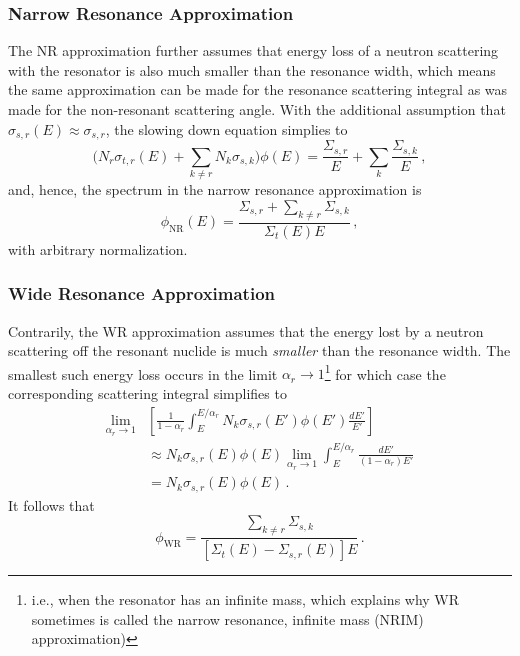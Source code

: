\subsubsection*{Narrow Resonance Approximation}

The NR approximation further assumes that energy loss of a neutron 
scattering with the resonator is also much smaller than the 
resonance width, which means the same approximation can be made 
for the resonance scattering integral as was made for the 
non-resonant scattering angle.  With the additional assumption 
that $\sigma_{s, r}(E) \approx \sigma_{s, r}$, the slowing 
down equation simplies to
\begin{equation}
     \Bigg ( N_r \sigma_{t,r}(E) + 
             \sum_{k\neq r} N_k \sigma_{s,k} 
     \Bigg ) \phi(E) = \frac{\Sigma_{s,r}}{E} + \sum_k \frac{\Sigma_{s,k}}{E} \, ,
\end{equation}
and, hence, the spectrum in the narrow resonance approximation is
\begin{equation}
 \phi_{\text{NR}}(E) = 
   \frac{ \Sigma_{s,r} + \sum\limits_{k\neq r} \Sigma_{s,k} }{ \Sigma_{t}(E) E } \, ,
\end{equation}
with arbitrary normalization.

\subsubsection*{Wide Resonance Approximation}

Contrarily, the WR approximation assumes that the energy lost by a
neutron scattering off the resonant nuclide is much \emph{smaller} than 
the resonance width.  The smallest such energy loss 
occurs in the limit $\alpha_r \to 1$\footnote{i.e., when the 
resonator has an infinite mass, which explains why WR sometimes 
is called the narrow resonance, infinite mass (NRIM) approximation)} 
for which case the corresponding 
scattering integral simplifies to 
\begin{equation}
\begin{split}
 \lim_{\alpha_r \to 1} & \left [ \frac{1}{1-\alpha_r} 
          \int^{E/\alpha_r}_E N_k \sigma_{s,r} (E') \phi(E') \frac{dE'}{E'} \right ] \\ 
  &\approx N_k \sigma_{s,r} (E) \phi(E) \lim_{\alpha_r \to 1}  \int^{E/\alpha_r}_E  \frac{dE'}{(1-\alpha_r)E'} \\
  &=  N_k \sigma_{s,r} (E) \phi(E) \, .
\end{split}
\end{equation}
It follows that 
\begin{equation}
 \phi_{\text{WR}} = \frac{\sum\limits_{k\neq r} \Sigma_{s,k} }{[\Sigma_t(E) - \Sigma_{s,r}(E)]E } \, .
\end{equation}

